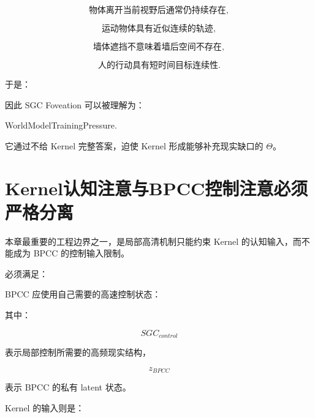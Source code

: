 \[
\text{物体离开当前视野后通常仍持续存在},
\]

\[
\text{运动物体具有近似连续的轨迹},
\]

\[
\text{墙体遮挡不意味着墙后空间不存在},
\]

\[
\text{人的行动具有短时间目标连续性}.
\]

于是：

\begin{statementbox}
\centering
{}
\end{statementbox}

因此 SGC Foveation 可以被理解为：

\begin{statementbox}
WorldModelTrainingPressure.
\end{statementbox}

它通过不给 Kernel 完整答案，迫使 Kernel 形成能够补充现实缺口的 $\Theta$。

\section{Kernel认知注意与BPCC控制注意必须严格分离}

本章最重要的工程边界之一，是局部高清机制只能约束 Kernel 的认知输入，而不能成为 BPCC 的控制输入限制。

必须满足：

\begin{statementbox}
\centering
{}
\end{statementbox}

BPCC 应使用自己需要的高速控制状态：

\begin{statementbox}
\centering
{}
\end{statementbox}

其中：

\[
SGC_{control}
\]

表示局部控制所需要的高频现实结构，

\[
z_{BPCC}
\]

表示 BPCC 的私有 latent 状态。

Kernel 的输入则是：

\begin{statementbox}
\centering
{}
\end{statementbox}


